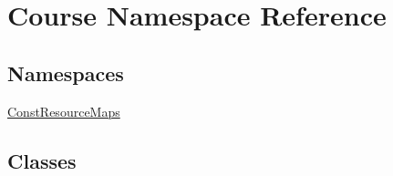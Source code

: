 \hypertarget{namespaceCourse}{\section{Course Namespace Reference}
\label{namespaceCourse}
}
\subsection*{Namespaces}
\begin{DoxyCompactItemize}
\item 
\hyperlink{namespaceCourse_1_1ConstResourceMaps}{Const\-Resource\-Maps}
\end{DoxyCompactItemize}
\subsection*{Classes}
